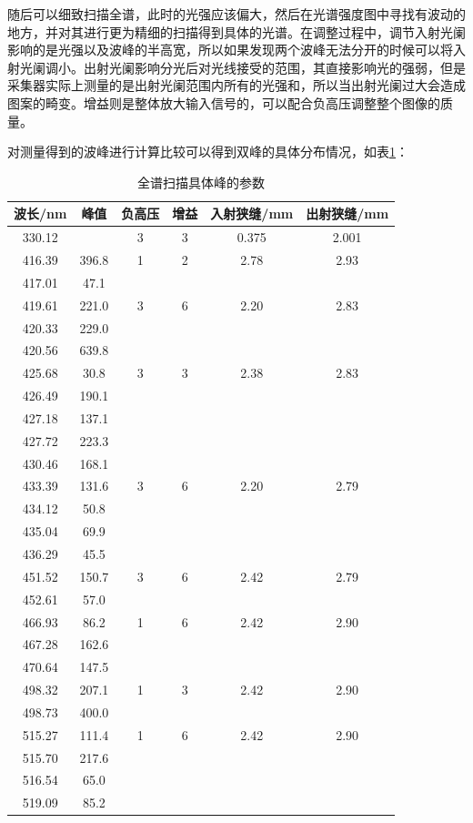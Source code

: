 \documentclass[aps,pre,12pt,preprint,onecolumn,showpacs,showkeys,UTF8]{revtex4-1}
\begin{document}
\newpage

随后可以细致扫描全谱，此时的光强应该偏大，然后在光谱强度图中寻找有波动的地方，并对其进行更为精细的扫描得到具体的光谱。在调整过程中，调节入射光阑影响的是光强以及波峰的半高宽，所以如果发现两个波峰无法分开的时候可以将入射光阑调小。出射光阑影响分光后对光线接受的范围，其直接影响光的强弱，但是采集器实际上测量的是出射光阑范围内所有的光强和，所以当出射光阑过大会造成图案的畸变。增益则是整体放大输入信号的，可以配合负高压调整整个图像的质量。

对测量得到的波峰进行计算比较可以得到双峰的具体分布情况，如表\ref{table1}：
\begin{center}
	\begin{table}
		\caption{全谱扫描具体峰的参数}
		\label{table1}
		\begin{tabular}{cccccc}
			\hline
			\hline
			波长/nm&峰值&负高压&增益&入射狭缝/mm&出射狭缝/mm \\
			\hline
			330.12&&3&3&0.375&2.001\\
			\hline
			416.39&396.8&1&2&2.78&2.93\\
			417.01&47.1\\
			\hline
			419.61&221.0&3&6&2.20&2.83\\
			420.33&229.0\\
			420.56&639.8\\
			\hline
			425.68&30.8&3&3&2.38&2.83\\
			426.49&190.1\\
			427.18&137.1\\
			427.72&223.3\\
			430.46&168.1\\
			\hline
			433.39&131.6&3&6&2.20&2.79\\
			434.12&50.8\\
			435.04&69.9\\
			436.29&45.5\\
			\hline
			451.52&150.7&3&6&2.42&2.79\\
			452.61&57.0\\
			\hline
			466.93&86.2&1&6&2.42&2.90\\
			467.28&162.6\\
			470.64&147.5\\
			\hline
			498.32&207.1&1&3&2.42&2.90\\
			498.73&400.0\\
			\hline
			515.27&111.4&1&6&2.42&2.90\\
			515.70&217.6\\
			516.54&65.0\\
			519.09&85.2\\

\end{tabular}
\end{table}
\end{center}
\end{document}
